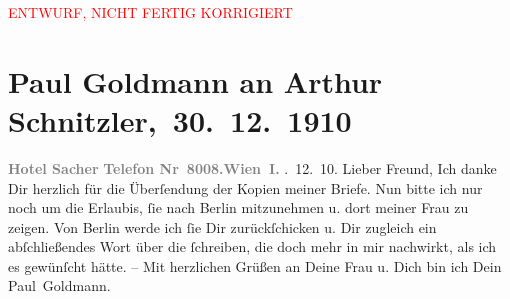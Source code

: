 
\begin{center}
            \textcolor{red}{ENTWURF, NICHT FERTIG KORRIGIERT}
                      \end{center}
            
         
         \renewcommand{\erwaehntePersonen}{Personen: Eva Marie Goldmann, Olga Schnitzler}
         \renewcommand{\erwaehnteOrte}{Orte: Berlin, Hotel Sacher, Wien}
         \renewcommand{\erwaehnteWerke}{}
               \section[ Paul Goldmann an Arthur Schnitzler, 30. 12. 1910]{ Paul Goldmann an Arthur Schnitzler, 30. 12. 1910}\nopagebreak{}\rehead{ }\begin{ledgroupsized}[t]{13cm}\normalsize\beginnumbering \toendnotes[C]{\smallbreak\pagebreak[2]} 
\toendnotes[C]{\smallbreak}\pstart
           \noindent{}\raggedleft{}{\pb}\textcolor{gray}{\textbf{Hotel Sacher}}\pend
           \pstart
           \noindent{}\textcolor{gray}{\textbf{Telefon Nr 8008.}}\hfill \textcolor{gray}{\textbf{Wien I.}}\pend
           . 12. 10. Lieber
                     Freund,\pend
           \pstart
           Ich danke Dir herzlich für die Überſendung der Kopien meiner Briefe. Nun bitte ich
               nur noch um die Erlaubis, ſie nach Berlin
               mitzunehmen u. dort meiner Frau zu zeigen. Von Berlin werde ich ſie
               Dir zurückſchicken u. Dir zugleich ein abſchließendes Wort über die \label{K_L03472-1v}\label{K_L03472-1h} ſchreiben, die doch mehr in mir nachwirkt, als ich es gewünſcht hätte. – Mit
               herzlichen Grüßen an Deine Frau u. Dich bin ich Dein \spacefill\mbox{Paul Goldmann.}\pend
           
         
         \endnumbering{}\end{ledgroupsized}\begin{anhang}\end{anhang}\newcommand{\dateiname}{L03472}\newcommand{\titel}{Paul Goldmann an Arthur Schnitzler, 30. 12. 1910}\newcommand{\editorInnen}{Martin Anton Müller und Laura Untner}
      
